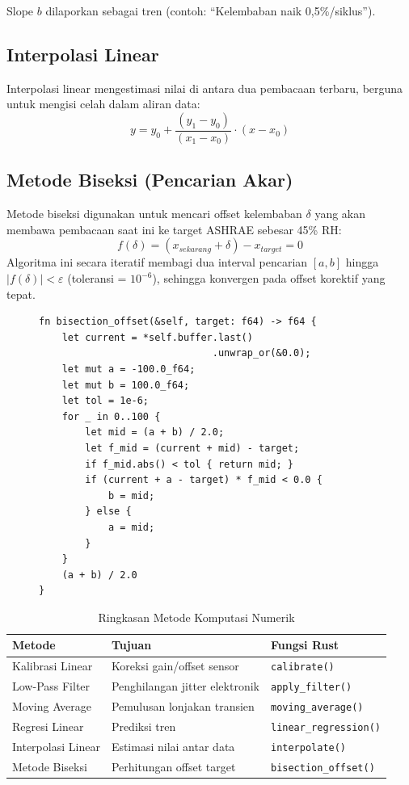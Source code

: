 \documentclass[journal]{IEEEtran}
\begin{document}
Slope $b$ dilaporkan sebagai tren (contoh: ``Kelembaban naik 0,5\%/siklus'').

\subsection{Interpolasi Linear}
Interpolasi linear mengestimasi nilai di antara dua pembacaan terbaru, berguna untuk mengisi celah dalam aliran data:
\begin{equation}
  y = y_0 + \frac{(y_1 - y_0)}{(x_1 - x_0)} \cdot (x - x_0)
\end{equation}

\subsection{Metode Biseksi (Pencarian Akar)}
Metode biseksi digunakan untuk mencari offset kelembaban $\delta$ yang akan membawa pembacaan saat ini ke target ASHRAE sebesar 45\% RH:
\begin{equation}
  f(\delta) = (x_{sekarang} + \delta) - x_{target} = 0
\end{equation}
Algoritma ini secara iteratif membagi dua interval pencarian $[a, b]$ hingga $|f(\delta)| < \varepsilon$ (toleransi = $10^{-6}$), sehingga konvergen pada offset korektif yang tepat.

\begin{figure}[H]
\begin{lstlisting}[caption={Implementasi Metode Biseksi}]
fn bisection_offset(&self, target: f64) -> f64 {
    let current = *self.buffer.last()
                              .unwrap_or(&0.0);
    let mut a = -100.0_f64;
    let mut b = 100.0_f64;
    let tol = 1e-6;
    for _ in 0..100 {
        let mid = (a + b) / 2.0;
        let f_mid = (current + mid) - target;
        if f_mid.abs() < tol { return mid; }
        if (current + a - target) * f_mid < 0.0 {
            b = mid;
        } else {
            a = mid;
        }
    }
    (a + b) / 2.0
}
\end{lstlisting}
\end{figure}

\begin{table}[H]
  \centering
  \caption{Ringkasan Metode Komputasi Numerik}
  \begin{tabular}{@{}lll@{}}
    \toprule
    \textbf{Metode} & \textbf{Tujuan} & \textbf{Fungsi Rust} \\
    \midrule
    Kalibrasi Linear    & Koreksi gain/offset sensor & \texttt{calibrate()} \\
    Low-Pass Filter     & Penghilangan jitter elektronik & \texttt{apply\_filter()} \\
    Moving Average      & Pemulusan lonjakan transien & \texttt{moving\_average()} \\
    Regresi Linear      & Prediksi tren & \texttt{linear\_regression()} \\
    Interpolasi Linear  & Estimasi nilai antar data & \texttt{interpolate()} \\
    Metode Biseksi      & Perhitungan offset target & \texttt{bisection\_offset()} \\
    \bottomrule
  \end{tabular}
\end{table}
\end{document}
